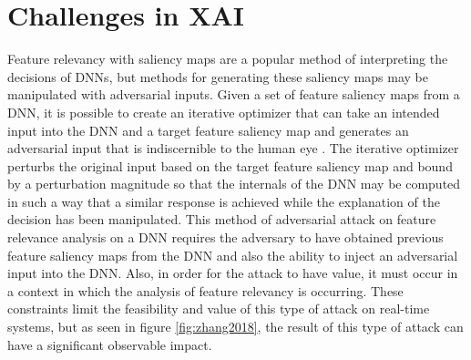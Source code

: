 \section{Challenges in XAI} \label{sec:Challenges}

Feature relevancy with saliency maps are a popular method of interpreting the decisions of DNNs, but methods for generating these saliency maps may be manipulated with adversarial inputs.  Given a set of feature saliency maps from a DNN, it is possible to create an iterative optimizer that can take an intended input into the DNN and a target feature saliency map and generates an adversarial input that is indiscernible to the human eye \cite{DBLP:journals/corr/abs-1812-00891}.  The iterative optimizer perturbs the original input based on the target feature saliency map and bound by a perturbation magnitude so that the internals of the DNN may be computed in such a way that a similar response is achieved while the explanation of the decision has been manipulated.  This method of adversarial attack on feature relevance analysis on a DNN requires the adversary to have obtained previous feature saliency maps from the DNN and also the ability to inject an adversarial input into the DNN.  Also, in order for the attack to have value, it must occur in a context in which the analysis of feature relevancy is occurring.  These constraints limit the feasibility and value of this type of attack on real-time systems, but as seen in figure \ref{fig:zhang2018}, the result of this type of attack can have a significant observable impact.


